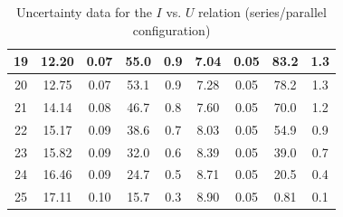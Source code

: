 \documentclass[12pt]{article}
\begin{document}
\begin{table}[H]
\begin{tabular}{|c|c|c|c|c|c|c|c|c|}
19 & 12.20&0.07    & 55.0&0.9            & 7.04&0.05     & 83.2&1.3           \\ \hline
20 & 12.75&0.07    & 53.1&0.9            & 7.28&0.05     & 78.2&1.3           \\ \hline
21 & 14.14&0.08    & 46.7&0.8            & 7.60&0.05     & 70.0&1.2           \\ \hline
22 & 15.17&0.09    & 38.6&0.7            & 8.03&0.05     & 54.9&0.9          \\ \hline
23 & 15.82&0.09    & 32.0&0.6            & 8.39&0.05     & 39.0&0.7            \\ \hline
24 & 16.46&0.09    & 24.7&0.5            & 8.71&0.05     & 20.5&0.4            \\ \hline
25 & 17.11&0.10    & 15.7&0.3            & 8.90&0.05     & 0.81&0.1         \\ \hline
\end{tabular}
\caption{Uncertainty data for the $I$ vs. $U$ relation (series/parallel configuration)}
\end{table}
\end{document}
